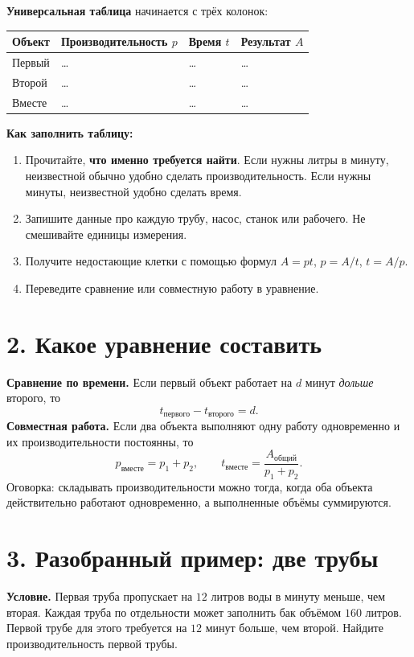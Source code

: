 \documentclass[a4paper,12pt]{article}
\newcommand{\topic}[1]{\section*{\textcolor{darkaccent}{#1}}}
\newcommand{\linekey}[1]{\textcolor{darkaccent}{\textbf{#1}}}
\begin{document}
\linekey{Универсальная таблица} начинается с трёх колонок:
\begin{center}
\begin{tabularx}{\linewidth}{@{}lXXX@{}}
\toprule
Объект & Производительность $p$ & Время $t$ & Результат $A$ \\
\midrule
Первый & \dots & \dots & \dots \\
Второй & \dots & \dots & \dots \\
Вместе & \dots & \dots & \dots \\
\bottomrule
\end{tabularx}
\end{center}

\textbf{Как заполнить таблицу:}
\begin{enumerate}[itemsep=2pt]
\item Прочитайте, \textbf{что именно требуется найти}. Если нужны литры в минуту, неизвестной обычно удобно сделать производительность. Если нужны минуты, неизвестной удобно сделать время.
\item Запишите данные про каждую трубу, насос, станок или рабочего. Не смешивайте единицы измерения.
\item Получите недостающие клетки с помощью формул $A=pt$, $p=A/t$, $t=A/p$.
\item Переведите сравнение или совместную работу в уравнение.
\end{enumerate}

\topic{2. Какое уравнение составить}
\textbf{Сравнение по времени.} Если первый объект работает на $d$ минут \emph{дольше} второго, то
\begin{equation*}
\boxed{t_{\text{первого}}-t_{\text{второго}}=d}.
\end{equation*}
\textbf{Совместная работа.} Если два объекта выполняют одну работу одновременно и их производительности постоянны, то
\begin{equation*}
\boxed{p_{\text{вместе}}=p_1+p_2},\qquad
\boxed{t_{\text{вместе}}=\frac{A_{\text{общий}}}{p_1+p_2}}.
\end{equation*}
\textcolor{muted}{Оговорка: складывать производительности можно тогда, когда оба объекта действительно работают одновременно, а выполненные объёмы суммируются.}

\clearpage
\topic{3. Разобранный пример: две трубы}
\textbf{Условие.} Первая труба пропускает на $12$ литров воды в минуту меньше, чем вторая. Каждая труба по отдельности может заполнить бак объёмом $160$ литров. Первой трубе для этого требуется на $12$ минут больше, чем второй. Найдите производительность первой трубы.
\end{document}
